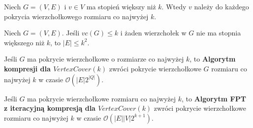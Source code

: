 \begin{lemat}
    Niech $G = (V, E)$ i $v \in V$ ma stopień większy niż $k$. Wtedy $v$ należy do każdego pokrycia wierzchołkowego
    rozmiaru co najwyżej $k$.
\end{lemat}

\begin{lemat}
    Niech $G = (V, E)$. Jeśli $vc(G) \leq k$ i żaden wierzchołek w $G$ nie ma stopnia większego niż $k$, to $|E| \leq k^2$.
\end{lemat}

\begin{lemat}
    Jeśli $G$ ma pokrycie wierzchołkowe o rozmiarze co najwyżej $k$,
    to \textbf{Algorytm kompresji dla $VertexCover(k)$} zwróci pokrycie wierzchołkowe $G$
    rozmiaru co najwyżej $k$ w czasie $\mathcal{O}(|E|2^{|Q|})$.
\end{lemat}

\begin{lemat}
    Jeśli $G$ ma pokrycie wierzchołkowe rozmiaru co najwyżej $k$,
    to \textbf{Algorytm FPT z iteracyjną kompresją dla $VertexCover(k)$} zwróci
    pokrycie wierzchołkowe rozmiaru co najwyżej $k$ w czasie $\mathcal{O}(|E||V|2^{k + 1})$.
\end{lemat}